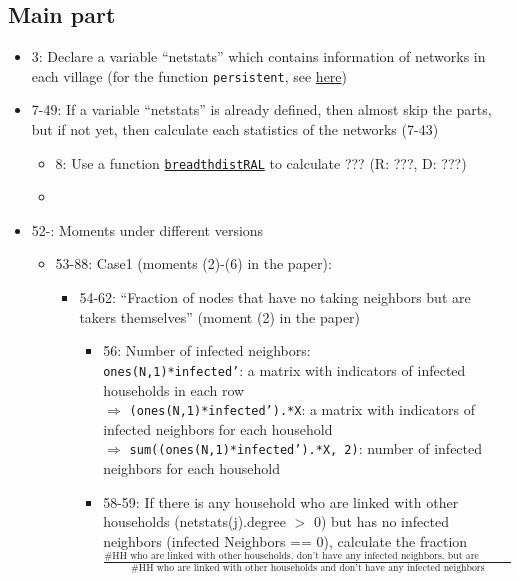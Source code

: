 \documentclass[10pt,letterpaper]{article}
\begin{document}
\subsection*{Main part}
\begin{itemize}
  \item 3: Declare a variable ``netstats'' which contains information of networks in each village (for the function \texttt{persistent}, see \href{https://www.mathworks.com/help/matlab/ref/persistent.html}{here})
  \item 7-49: If a variable ``netstats'' is already defined, then almost skip the parts, but if not yet, then calculate each statistics of the networks (7-43)
    \begin{itemize}
      \item 8: Use a function \hyperref[breadthdistRAL]{\texttt{breadthdistRAL}} to calculate ??? (R: ???, D: ???)
      \item 
    \end{itemize}
  \item 52-: Moments under different versions
    \begin{itemize}
      \item 53-88: Case1 (moments (2)-(6) in the paper):
        \begin{itemize}
          \item 54-62: ``Fraction of nodes that have no taking neighbors but are takers themselves'' (moment (2) in the paper)
            \begin{itemize}
              \item 56: Number of infected neighbors: \\
                \texttt{ones(N,1)*infected'}: a matrix with indicators of infected households in each row \\
                $\Rightarrow$ \texttt{(ones(N,1)*infected').*X}: a matrix with indicators of infected neighbors for each household \\
                $\Rightarrow$ \texttt{sum((ones(N,1)*infected').*X, 2)}: number of infected neighbors for each household
              \item 58-59: If there is any household who are linked with other households (netstats(j).degree $>$ 0) but has no infected neighbors (infected Neighbors == 0), 
                calculate the fraction $\frac{\text{\# HH who are linked with other households, don't have any infected neighbors, but are infected themselves}}{\text{\# HH who are linked with other households and don't have any infected neighbors}}$

\end{itemize}
\end{itemize}
\end{itemize}
\end{itemize}
\end{document}
